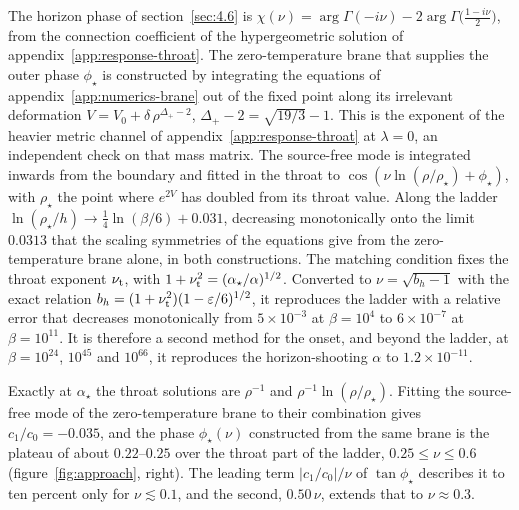 The horizon phase of section~\ref{sec:4.6} is
$\chi(\nu) = \arg\Gamma(-i\nu) - 2\arg\Gamma\big(\tfrac{1-i\nu}2\big)$,
from the connection coefficient of the hypergeometric solution of
appendix~\ref{app:response-throat}. The zero-temperature brane that
supplies the outer phase $\phi_\star$ is constructed by integrating the
equations of appendix~\ref{app:numerics-brane} out of the fixed point along
its irrelevant deformation $V = V_0 + \delta\,\rho^{\Delta_+ - 2}$,
$\Delta_+ - 2 = \sqrt{19/3} - 1$. This is the exponent of the heavier metric
channel of appendix~\ref{app:response-throat} at $\lambda = 0$, an
independent check on that mass matrix. The source-free mode is integrated
inwards from the boundary and fitted in the throat to
$\cos(\nu\ln(\rho/\rho_\star) + \phi_\star)$, with $\rho_\star$ the point
where $e^{2V}$ has doubled from its throat value. Along the ladder
$\ln(\rho_\star/h) \to \tfrac14\ln(\beta/6) + 0.031$, decreasing
monotonically onto the limit $0.0313$ that the scaling symmetries of the
equations give from the zero-temperature brane alone, in both constructions. The matching condition fixes the throat exponent
$\nu_{\rm t}$, with $1 + \nu_{\rm t}^2 = (\alpha_\star/\alpha)^{1/2}$.
Converted to $\nu = \sqrt{b_h - 1}$ with the exact relation
$b_h = (1 + \nu_{\rm t}^2)(1 - \varepsilon/6)^{1/2}$, it reproduces the ladder with
a relative error that decreases monotonically from $5\times10^{-3}$ at
$\beta = 10^4$ to $6\times10^{-7}$ at $\beta = 10^{11}$. It is therefore a
second method for the onset, and beyond the ladder, at
$\beta = 10^{24}$, $10^{45}$ and $10^{66}$, it reproduces the
horizon-shooting $\alpha$ to $1.2\times10^{-11}$.

Exactly at $\alpha_\star$ the throat solutions are $\rho^{-1}$ and
$\rho^{-1}\ln(\rho/\rho_\star)$. Fitting the source-free mode of the
zero-temperature brane to their combination gives $c_1/c_0 = -0.035$, and
the phase $\phi_\star(\nu)$ constructed from the same brane is the plateau
of about $0.22$--$0.25$ over the throat part of the ladder, $0.25 \le \nu \le 0.6$
(figure~\ref{fig:approach}, right). The leading term
$|c_1/c_0|/\nu$ of $\tan\phi_\star$ describes it to ten percent only for
$\nu \lesssim 0.1$, and the second, $0.50\,\nu$, extends that to
$\nu \approx 0.3$.

